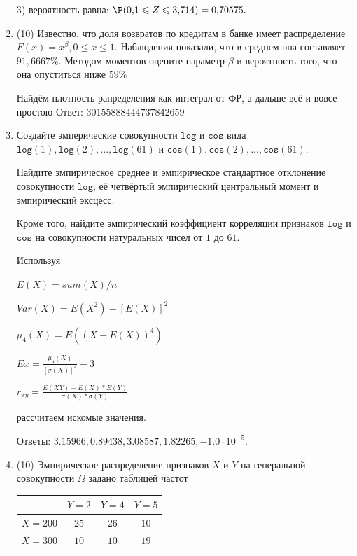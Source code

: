 \documentclass[a4paper,14pt]{article}
\begin{document}
\begin{enumerate}
3) вероятность равна:
$
\P(0,\!1\leqslant Z\leqslant 3,\!714)=
0,\!70575.
$


\item

(10) Известно, что доля возвратов по кредитам в банке имеет распределение $F(x) = x ^{\beta}, 0 \leqslant x \leqslant 1$.
Наблюдения показали, что в среднем она составляет $91,6667\%$. Методом моментов оцените параметр $\beta$ и
вероятность того, что она опуститься ниже $59\%$




Найдём плотность рапределения как интеграл от ФР, а дальше всё и вовсе простою Ответ: $30155888444737842659$


\item

    
    Создайте эмперические совокупности  $\mathtt{\text{log}}$ и $\mathtt{\text{cos}}$ вида $\mathtt{\text{log}}(1),\mathtt{\text{log}}(2), ..., \mathtt{\text{log}}(61) $ и $\mathtt{\text{cos}}(1),\mathtt{\text{cos}}(2), ..., \mathtt{\text{cos}}(61). $

    Найдите эмпирическое среднее и эмпирическое стандартное отклонение совокупности $\mathtt{\text{log}}$, её четвёртый эмпирический центральный момент и эмпирический эксцесс.

    Кроме того, найдите эмпирический коэффициент корреляции признаков $\mathtt{\text{log}}$ и $\mathtt{\text{cos}}$ на совокупности натуральных чисел от $1$ до $61$.
    


    
    Используя

	$E(X) = sum(X) / n$

	$Var(X) = E(X^2) - [E(X)]^2$

	$\mu_4(X) = E((X-E(X))^4)$

	$Ex = \frac{\mu_4(X)}{[\sigma(X)]^4} - 3$

	$r_{xy} = \frac{E(XY) - E(X) * E(Y)}{\sigma(X) * \sigma(Y)}$

    рассчитаем искомые значения.

    Ответы: $3.15966, 0.89438, 3.08587, 1.82265, -1.0 \cdot 10^{-5}$.

    

\item


(10) Эмпирическое распределение признаков $X$ и $Y$ на генеральной совокупности $\Omega$ задано таблицей частот  
 
\begin{tabular}{ | c | c | c | c | }
\hline
 & $Y = 2$ & $Y = 4$ & $Y = 5$  \\ \hline
$X = 200$ & $25$ & $26$ & $10$\\ \hline
$X = 300$ & $10$ & $10$ & $19$\\
\hline
\end{tabular}


\end{enumerate}
\end{document}
